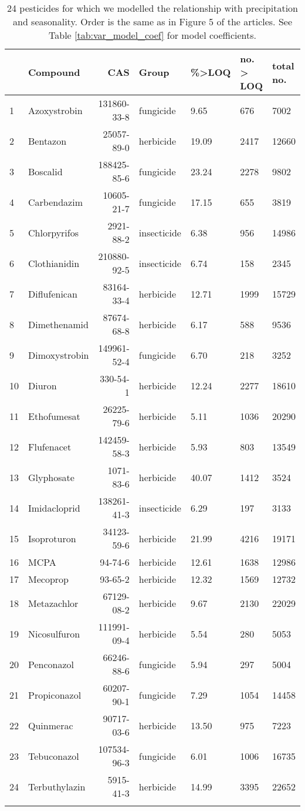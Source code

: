 \begingroup\fontsize{8pt}{10pt}\selectfont
\begin{longtable}{lp{2.5cm}rlp{1.5cm}p{2cm}p{2cm}}
\caption{24 pesticides for which we modelled the relationship with precipitation and seasonality.
                    Order is the same as in Figure 5 of the articles. See Table \ref{tab:var_model_coef} for model coefficients.} \\ 
  \toprule
 & Compound & CAS & Group & \%>LOQ & no. > LOQ & total no. \\ 
  \midrule
1 & Azoxystrobin & 131860-33-8 & fungicide & 9.65 & 676 & 7002 \\ 
  2 & Bentazon & 25057-89-0 & herbicide & 19.09 & 2417 & 12660 \\ 
  3 & Boscalid & 188425-85-6 & fungicide & 23.24 & 2278 & 9802 \\ 
  4 & Carbendazim & 10605-21-7 & fungicide & 17.15 & 655 & 3819 \\ 
  5 & Chlorpyrifos & 2921-88-2 & insecticide & 6.38 & 956 & 14986 \\ 
  6 & Clothianidin & 210880-92-5 & insecticide & 6.74 & 158 & 2345 \\ 
  7 & Diflufenican & 83164-33-4 & herbicide & 12.71 & 1999 & 15729 \\ 
  8 & Dimethenamid & 87674-68-8 & herbicide & 6.17 & 588 & 9536 \\ 
  9 & Dimoxystrobin & 149961-52-4 & fungicide & 6.70 & 218 & 3252 \\ 
  10 & Diuron & 330-54-1 & herbicide & 12.24 & 2277 & 18610 \\ 
  11 & Ethofumesat & 26225-79-6 & herbicide & 5.11 & 1036 & 20290 \\ 
  12 & Flufenacet & 142459-58-3 & herbicide & 5.93 & 803 & 13549 \\ 
  13 & Glyphosate & 1071-83-6 & herbicide & 40.07 & 1412 & 3524 \\ 
  14 & Imidacloprid & 138261-41-3 & insecticide & 6.29 & 197 & 3133 \\ 
  15 & Isoproturon & 34123-59-6 & herbicide & 21.99 & 4216 & 19171 \\ 
  16 & MCPA & 94-74-6 & herbicide & 12.61 & 1638 & 12986 \\ 
  17 & Mecoprop & 93-65-2 & herbicide & 12.32 & 1569 & 12732 \\ 
  18 & Metazachlor & 67129-08-2 & herbicide & 9.67 & 2130 & 22029 \\ 
  19 & Nicosulfuron & 111991-09-4 & herbicide & 5.54 & 280 & 5053 \\ 
  20 & Penconazol & 66246-88-6 & fungicide & 5.94 & 297 & 5004 \\ 
  21 & Propiconazol & 60207-90-1 & fungicide & 7.29 & 1054 & 14458 \\ 
  22 & Quinmerac & 90717-03-6 & herbicide & 13.50 & 975 & 7223 \\ 
  23 & Tebuconazol & 107534-96-3 & fungicide & 6.01 & 1006 & 16735 \\ 
  24 & Terbuthylazin & 5915-41-3 & herbicide & 14.99 & 3395 & 22652 \\ 
   \bottomrule
\label{tab:var_model}
\end{longtable}
\endgroup
